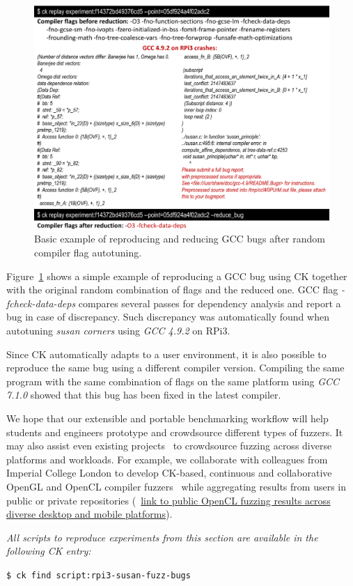    \begin{figure}[htbp]
     \centering
      \includegraphics[width=5.2in]
      {ck-assets/60e96767e8bd4522-cropped.pdf} %
     \caption{
       Basic example of reproducing and reducing GCC bugs after random compiler flag autotuning.
     }
     \label{fig:ck-trivial-fuzzing-example}
   \end{figure}

Figure~\ref{fig:ck-trivial-fuzzing-example} shows a simple example of reproducing 
a GCC bug using CK together with the original random combination of flags 
and the reduced one.
%
GCC flag \emph{-fcheck-data-deps} compares several passes for dependency analysis
and report a bug in case of discrepancy.
%
Such discrepancy was automatically found when autotuning \emph{susan corners} 
using \emph{GCC 4.9.2} on RPi3.

Since CK automatically adapts to a user environment, it is also possible
to reproduce the same bug using a different compiler version.
%
Compiling the same program with the same combination of flags on the same platform
using \emph{GCC 7.1.0} showed that this bug has been fixed in the latest compiler.

We hope that our extensible and portable benchmarking workflow will help students and engineers 
prototype and crowdsource different types of fuzzers.
It may also assist even existing projects~\cite{microsoft-fuzz,oss-fuzz}
to crowdsource fuzzing across diverse platforms and workloads.
For example, we collaborate with colleagues from Imperial College London
to develop CK-based, continuous and collaborative OpenGL and OpenCL compiler 
fuzzers~\cite{Lidbury:2015:MCF:2737924.2737986,DBLP:journals/corr/LascuD15,ck-clsmith}
while aggregating results from users in public or private repositories 
(~\href{http://cknowledge.org/repo/web.php?template=cknowledge&wcid=bc0409fb61f0aa82:1b437e72c74fe782&table_sort=2}{link to public OpenCL fuzzing results across diverse desktop and mobile platforms}).

\textit{All scripts to reproduce experiments from this section are available in the following CK entry:}

\begin{flushleft}
\texttt{\$ ck find script:rpi3-susan-fuzz-bugs}
\end{flushleft}
